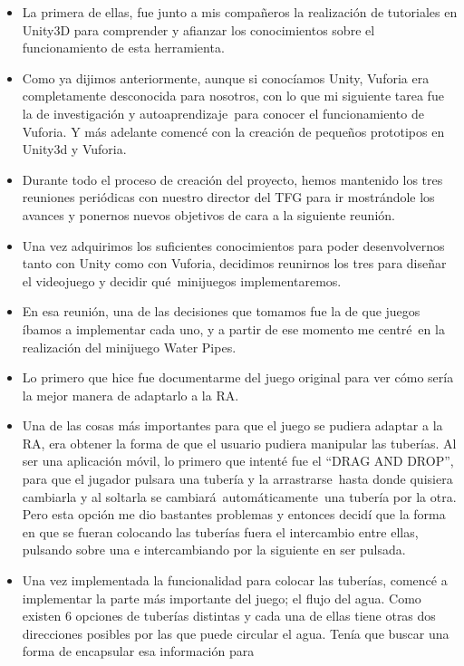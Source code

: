 \begin{itemize}
\item
  La primera de ellas, fue junto a mis compañeros la realización de
  tutoriales en Unity3D para comprender y afianzar los conocimientos
  sobre el funcionamiento de esta herramienta.
\item
  Como ya dijimos anteriormente, aunque si conocíamos Unity, Vuforia era
  completamente desconocida para nosotros, con lo que mi siguiente tarea
  fue la de investigación y autoaprendizaje~para conocer el
  funcionamiento de Vuforia. Y más adelante comencé con la creación de
  pequeños prototipos en Unity3d y Vuforia.
\item
  Durante todo el proceso de creación del proyecto, hemos mantenido los
  tres reuniones periódicas con nuestro director del TFG para ir
  mostrándole los avances y ponernos nuevos objetivos de cara a la
  siguiente reunión.
\item
  Una vez adquirimos los suficientes conocimientos para poder
  desenvolvernos tanto con Unity como con Vuforia, decidimos reunirnos
  los tres para diseñar el videojuego y decidir qué~minijuegos
  implementaremos.
\item
  En esa reunión, una de las decisiones que tomamos fue la de que juegos
  íbamos a implementar cada uno, y a partir de ese momento me centré~en
  la realización del minijuego Water Pipes.
\item
  Lo primero que hice fue documentarme del juego original para ver cómo
  sería la mejor manera de adaptarlo a la RA.
\item
  Una de las cosas más importantes para que el juego se pudiera adaptar
  a la RA, era obtener la forma de que el usuario pudiera manipular las
  tuberías. Al ser una aplicación móvil, lo primero que intenté fue el
  ``DRAG AND DROP'', para que el jugador pulsara una tubería y la
  arrastrarse~hasta donde quisiera cambiarla y al soltarla se
  cambiará~automáticamente~una tubería por la otra. Pero esta opción me
  dio bastantes problemas y entonces decidí que la forma en que se
  fueran colocando las tuberías fuera el intercambio entre ellas,
  pulsando sobre una e intercambiando por la siguiente en ser pulsada.
\item
  Una vez implementada la funcionalidad para colocar las tuberías,
  comencé a implementar la parte más importante del juego; el flujo del
  agua. Como existen 6 opciones de tuberías distintas y cada una de
  ellas tiene otras dos direcciones posibles por las que puede circular
  el agua. Tenía que buscar una forma de encapsular esa información para

\end{itemize}
